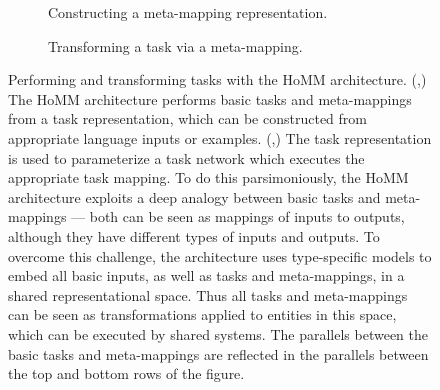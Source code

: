 \begin{figure}[htbp]
\begin{subfigure}{0.5\textwidth}
\caption{Constructing a meta-mapping representation.}\label{fig:HoMM_architecture:constructing_meta}
\end{subfigure}%
\begin{subfigure}{0.5\textwidth}
\caption{Transforming a task via a meta-mapping.}\label{fig:HoMM_architecture:performing_meta}
\end{subfigure}
\caption[Performing and transforming tasks with the HoMM architecture.]{Performing and transforming tasks with the HoMM architecture. (,) The HoMM architecture performs basic tasks and meta-mappings from a task representation, which can be constructed from appropriate language inputs or examples. (,) The task representation is used to parameterize a task network which executes the appropriate task mapping. To do this parsimoniously, the HoMM architecture exploits a deep analogy between basic tasks and meta-mappings --- both can be seen as mappings of inputs to outputs, although they have different types of inputs and outputs. To overcome this challenge, the architecture uses type-specific models to embed all basic inputs, as well as tasks and meta-mappings, in a shared representational space. Thus all tasks and meta-mappings can be seen as transformations applied to entities in this space, which can be executed by shared systems. The parallels between the basic tasks and meta-mappings are reflected in the parallels between the top and bottom rows of the figure.} \label{fig:HoMM_architecture}
\end{figure}

